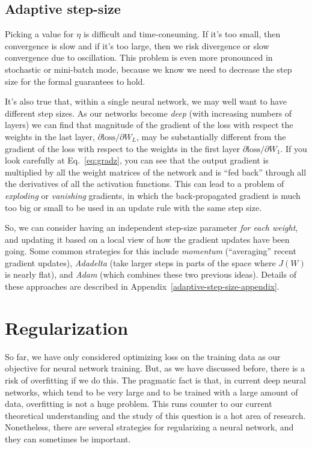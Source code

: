 \subsection{Adaptive step-size}
Picking a value for $\eta$ is difficult and time-consuming.  If it's
too small, then convergence is slow and if it's too large, then we
risk divergence or slow convergence due to oscillation.  This problem
is even more pronounced in stochastic or mini-batch mode, because we
know we need to decrease the step size for the formal guarantees to
hold.

It's also true that, within a single neural network, we may well want
to have different step sizes.  As our networks become {\em deep} (with
increasing numbers of layers) we can find that magnitude of the
gradient of the loss with respect the weights in the last layer,
$\partial \text{loss} / \partial W_L$, may be substantially
different from the gradient of the loss with respect to the weights in
the first layer $\partial \text{loss} / \partial W_1$.  If you look
carefully at Eq.~\ref{eq:gradz}, you can see that the output
gradient is multiplied by all the weight matrices of the network and
is ``fed back'' through all the derivatives of all the activation
functions.  This can lead to a problem of {\em exploding}  or {\em
    vanishing} gradients, in which the back-propagated gradient is much
too big or small to be used in an update rule with the same step size.

So, we can consider having an independent step-size parameter {\em for each
    weight}, and updating it based on a local view of how the gradient
updates have been going.
Some common strategies for this include \emph{momentum} (``averaging'' recent gradient updates), \emph{Adadelta} (take larger steps in parts of the space where $J(W)$ is nearly flat), and \emph{Adam} (which combines these two previous ideas). Details of these approaches are described in Appendix~\ref{adaptive-step-size-appendix}. 


\section{Regularization}
So far, we have only considered optimizing loss on the training data
as our objective for neural network training.   But, as we have
discussed before, there is a risk of overfitting if we do this.  The
pragmatic fact is that,  in current deep neural networks, which tend to be very
large and to be trained with a large amount of data,  overfitting is
not a huge problem.  This runs counter to our current theoretical
understanding and the study of this question is a hot area of
research.  Nonetheless, there are several strategies for regularizing
a neural network, and they can sometimes be important.

